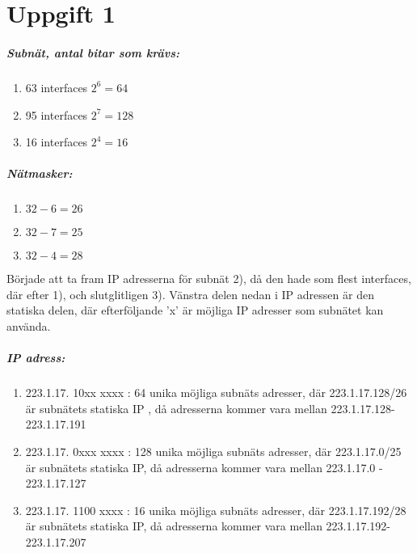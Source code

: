 \section{Uppgift 1}

\subparagraph{ Subnät, antal bitar som krävs:}
\begin{enumerate}
\item 63 interfaces \aprox $2^6 = 64$
\item 95 interfaces \aprox $2^7 = 128 $
\item 16 interfaces \aprox $2^4 = 16 $
\end{enumerate}



\subparagraph{ Nätmasker:}
\begin{enumerate}
\item $32-6=26$
\item $32-7=25$
\item $32-4=28$
\end{enumerate}


Började att ta fram IP adresserna för subnät 2), då den hade som flest interfaces, där efter 1), och
slutglitligen 3).  Vänstra delen nedan i IP adressen är den statiska delen, där efterföljande 'x' är
möjliga IP adresser som subnätet kan använda.
\subparagraph{ IP adress:}
\begin{enumerate}
\item 223.1.17. 10xx xxxx : 64 unika möjliga subnäts adresser, där 223.1.17.128/26 är subnätets
statiska IP
, då adresserna kommer vara mellan 223.1.17.128-223.1.17.191
\item 223.1.17. 0xxx xxxx : 128 unika möjliga subnäts adresser, där 223.1.17.0/25 är subnätets
statiska IP, då adresserna kommer vara
mellan
223.1.17.0 - 223.1.17.127
\item 223.1.17. 1100 xxxx : 16 unika möjliga subnäts adresser, där 223.1.17.192/28 är subnätets
statiska IP, då adresserna kommer vara
mellan 223.1.17.192-223.1.17.207
\end{enumerate}

